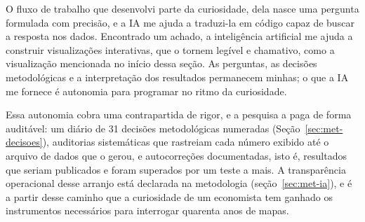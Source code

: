 O fluxo de trabalho que desenvolvi parte da curiosidade, dela nasce uma
pergunta formulada com precisão, e a IA me ajuda a traduzi-la em código
capaz de buscar a resposta nos dados. Encontrado um achado, a inteligência artificial me ajuda a
construir visualizações interativas, que o tornem legível e
chamativo, como a visualização mencionada no início dessa seção. As perguntas,
as decisões metodológicas e a interpretação dos resultados permanecem minhas; o que a IA me fornece é autonomia para
programar no ritmo da curiosidade.

Essa autonomia cobra uma contrapartida de rigor, e a pesquisa a paga de
forma auditável: um diário de 31 decisões metodológicas numeradas
(Seção~\ref{sec:met-decisoes}), auditorias sistemáticas que rastreiam cada
número exibido até o arquivo de dados que o gerou, e autocorreções
documentadas, isto é, resultados que seriam publicados e foram superados por
um teste a mais. A transparência operacional desse arranjo está declarada na
metodologia (seção~\ref{sec:met-ia}), e é a partir desse caminho que a curiosidade de um economista
tem ganhado os instrumentos necessários para interrogar quarenta anos de mapas.

